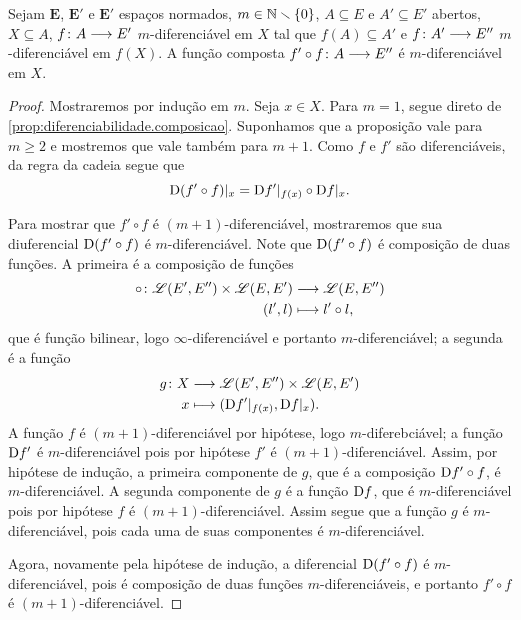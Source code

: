 \begin{proposition}
\label{prop:multidiferenciabilidade.composicao}
Sejam $\bm E$, $\bm E'$ e $\bm E'$ espaços normados, $m \in \mathbb{N} \smallsetminus \{0\}$, $A \subseteq E$ e $A' \subseteq E'$ abertos, $X \subseteq A$, ${f}\colon {A} \longrightarrow {E'}$ $m$-diferenciável em $X$ tal que $f(A) \subseteq A'$ e ${f}\colon {A'} \longrightarrow {E''}$ $m$-diferenciável em $f(X)$. A função composta ${f' \circ f}\colon {A} \longrightarrow {E''}$ é $m$-diferenciável em $X$.%
\end{proposition}
\begin{proof}
Mostraremos por indução em $m$. Seja $x \in X$. Para $m=1$, segue direto de \ref{prop:diferenciabilidade.composicao}. Suponhamos que a proposição vale para $m \geq 2$ e mostremos que vale também para $m+1$. Como $f$ e $f'$ são diferenciáveis, da regra da cadeia segue que
	\begin{equation*}
	\mathrm{D}(f' \circ f)|_x = \mathrm{D} f'|_{f(x)} \circ \mathrm{D} f|_x.
	\end{equation*}

Para mostrar que $f' \circ f$ é $(m+1)$-diferenciável, mostraremos que sua diuferencial $\mathrm{D}(f' \circ f)$ é $m$-diferenciável. Note que $\mathrm{D}(f' \circ f)$ é composição de duas funções. A primeira é a composição de funções
	\begin{align*}
	{\circ}\colon {\mathscr{L}(E',E'') \times \mathscr{L}(E,E')} &\longrightarrow {\mathscr{L}(E,E'')} \\{(l',l)} &\longmapsto l' \circ l,
	\end{align*}
que é função bilinear, logo $\infty$-diferenciável e portanto $m$-diferenciável; a segunda é a função
	\begin{align*}
	{g}\colon {X} &\longrightarrow {\mathscr{L}(E',E'') \times \mathscr{L}(E,E')} \\{x} &\longmapsto (\mathrm{D} f'|_{f(x)}, \mathrm{D} f|_x).
	\end{align*}
A função $f$ é $(m+1)$-diferenciável por hipótese, logo $m$-diferebciável; a função $\mathrm{D} f'$ é $m$-diferenciável pois por hipótese $f'$ é $(m+1)$-diferenciável. Assim, por hipótese de indução, a primeira componente de $g$, que é a composição $\mathrm{D} f' \circ f$, é $m$-diferenciável. A segunda componente de $g$ é a função $\mathrm{D} f$, que é $m$-diferenciável pois por hipótese $f$ é $(m+1)$-diferenciável. Assim segue que a função $g$ é $m$-diferenciável, pois cada uma de suas componentes é $m$-diferenciável.

Agora, novamente pela hipótese de indução, a diferencial $\mathrm{D}(f' \circ f)$ é $m$-diferenciável, pois é composição de duas funções $m$-diferenciáveis, e portanto $f' \circ f$ é $(m+1)$-diferenciável.
\end{proof}

